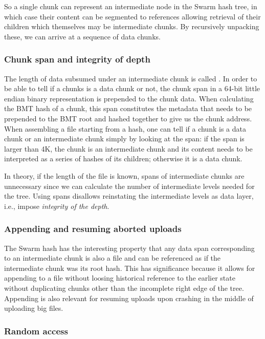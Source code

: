 So a single chunk can represent an intermediate node in the Swarm hash tree, in which case their content can be segmented to references allowing retrieval of their children which themselves may be intermediate chunks. By recursively unpacking these, we can arrive at a sequence of data chunks. 

\subsubsection{Chunk span and integrity of depth}

The length of data subsumed under an intermediate chunk is called . In order to be able to tell if a chunks is a data chunk or not, the chunk span in a 64-bit little endian binary representation is prepended to the chunk data.  When calculating the BMT hash of a chunk, this span constitutes the metadata that needs to be prepended to the BMT root and hashed together to give us the chunk address. When assembling a file starting from a hash, one can tell if a chunk is a data chunk or an intermediate chunk simply by looking at the span: if the span is larger than 4K, the chunk is an intermediate chunk and its content needs to be interpreted as a series of hashes of its children; otherwise it is a data chunk.

In theory, if the length of the file is known, spans of intermediate chunks are unnecessary since we can calculate the number of intermediate levels needed for the tree. Using spans disallows reinstating the intermediate levels as data layer, i.e., impose  \emph{integrity of the depth}. 

\subsubsection{Appending and resuming aborted uploads}

The Swarm hash has the interesting property that any data span corresponding to an intermediate chunk is also a file and can be referenced as if the intermediate chunk was its root hash. This has significance because it allows for appending to a file without loosing historical reference to the earlier state without duplicating chunks other than the incomplete right edge of the tree. Appending is also relevant for resuming uploads upon crashing in the middle of uploading big files.

\subsubsection{Random access}

